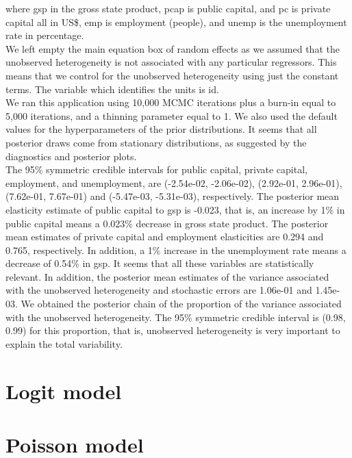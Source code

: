 \noindent where gsp in the gross state product, pcap is public capital, and pc is private capital all in US\$, emp is employment (people), and unemp is the unemployment rate in percentage.\\

We left empty the main equation box of random effects as we assumed that the unobserved heterogeneity is not associated with any particular regressors.
This means that we control for the unobserved heterogeneity using just the constant terms.
The variable which identifies the units is id.\\

We ran this application using 10,000 MCMC iterations plus a burn-in equal to 5,000 iterations, and a thinning parameter equal to 1.
We also used the default values for the hyperparameters of the prior distributions.
It seems that all posterior draws come from stationary distributions, as suggested by the diagnostics and posterior plots.\\

The 95\% symmetric credible intervals for public capital, private capital, employment, and unemployment, are (-2.54e-02, -2.06e-02), (2.92e-01, 2.96e-01), (7.62e-01, 7.67e-01) and (-5.47e-03, -5.31e-03), respectively.
The posterior mean elasticity estimate of public capital to gsp is -0.023, that is, an increase by 1\% in public capital means a 0.023\% decrease in gross state product.
The posterior mean estimates of private capital and employment elasticities are 0.294 and 0.765, respectively.
In addition, a 1\% increase in the unemployment rate means a decrease of 0.54\% in gsp.
It seems that all these variables are statistically relevant.
In addition, the posterior mean estimates of the variance associated with the unobserved heterogeneity and stochastic errors are 1.06e-01 and 1.45e-03.
We obtained the posterior chain of the proportion of the variance associated with the unobserved heterogeneity.
The 95\% symmetric credible interval is (0.98, 0.99) for this proportion, that is, unobserved heterogeneity is very important to explain the total variability.\\



\section{Logit model}\label{sec92}

\section{Poisson model}\label{sec93}

